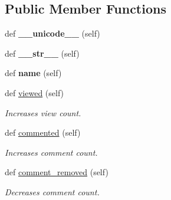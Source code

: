 \subsection*{Public Member Functions}
\begin{DoxyCompactItemize}
\item 
\hypertarget{class_meanco_app_1_1models_1_1topic_1_1_topic_ab64735546707fc292be67953e5699cd2}{}\label{class_meanco_app_1_1models_1_1topic_1_1_topic_ab64735546707fc292be67953e5699cd2} 
def {\bfseries \+\_\+\+\_\+unicode\+\_\+\+\_\+} (self)
\item 
\hypertarget{class_meanco_app_1_1models_1_1topic_1_1_topic_ae53f0969297491c4ca769a40789ffe96}{}\label{class_meanco_app_1_1models_1_1topic_1_1_topic_ae53f0969297491c4ca769a40789ffe96} 
def {\bfseries \+\_\+\+\_\+str\+\_\+\+\_\+} (self)
\item 
\hypertarget{class_meanco_app_1_1models_1_1topic_1_1_topic_add21bec6175d73eae29b7e766a9d4db8}{}\label{class_meanco_app_1_1models_1_1topic_1_1_topic_add21bec6175d73eae29b7e766a9d4db8} 
def {\bfseries name} (self)
\item 
def \hyperlink{class_meanco_app_1_1models_1_1topic_1_1_topic_a436224fa3327f5cb0436638585aff487}{viewed} (self)
\begin{DoxyCompactList}\small\item\em Increases view count. \end{DoxyCompactList}\item 
def \hyperlink{class_meanco_app_1_1models_1_1topic_1_1_topic_a9296294fed15990472ff572be0be6d4b}{commented} (self)
\begin{DoxyCompactList}\small\item\em Increases comment count. \end{DoxyCompactList}\item 
def \hyperlink{class_meanco_app_1_1models_1_1topic_1_1_topic_a595fff7e09861a17981f9c0c7a5c9dfd}{comment\+\_\+removed} (self)
\begin{DoxyCompactList}\small\item\em Decreases comment count. \end{DoxyCompactList}\end{DoxyCompactItemize}
